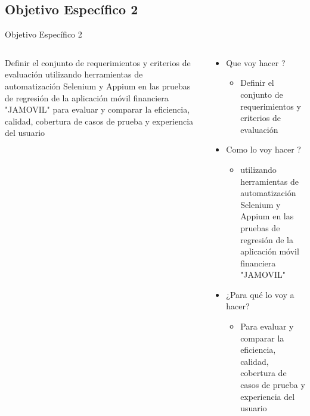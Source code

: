 \documentclass{beamer}
\begin{document}
\subsection{Objetivo Específico 2 }
\begin{frame}{Objetivo Específico 2 }
  \begin{columns}
    \begin{column}{0.5\textwidth}
    \justify
     Definir el conjunto de requerimientos y criterios de evaluación utilizando herramientas de automatización Selenium y Appium en las pruebas de regresión de la aplicación móvil financiera "JAMOVIL" para evaluar y comparar la eficiencia, calidad, cobertura de casos de prueba y experiencia del usuario 
    \end{column}
    \begin{column}{0.5\textwidth}
      \begin{itemize}
          \item Que voy hacer ?
          \begin{itemize}
              \item Definir el conjunto de requerimientos y criterios de evaluación
          \end{itemize}
          \item Como lo voy hacer ?
          \begin{itemize}
              \item utilizando herramientas de automatización Selenium y Appium en las pruebas de regresión de la aplicación móvil financiera "JAMOVIL"
          \end{itemize}
          \item ¿Para qué lo voy a hacer?
          \begin{itemize}
                  \item Para evaluar
y comparar la eficiencia, calidad,
cobertura de casos de prueba y
experiencia del usuario
          \end{itemize}
      \end{itemize}
    \end{column}
  \end{columns}
\end{frame}
\end{document}
